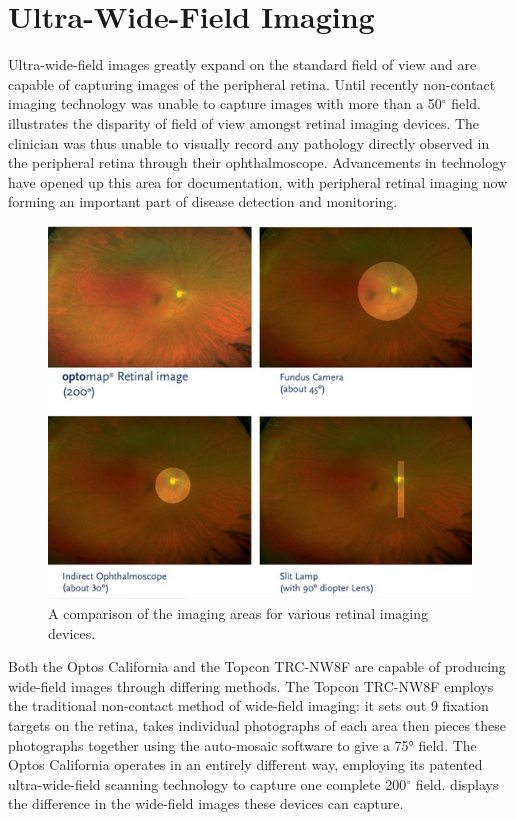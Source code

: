 \section{Ultra-Wide-Field Imaging}

Ultra-wide-field images greatly expand on the standard field of view and are capable of capturing images of the peripheral retina. Until recently non-contact imaging technology was unable to capture images with more than a 50$^\circ$ field.  illustrates the disparity of field of view amongst retinal imaging devices. The clinician was thus unable to visually record any pathology directly observed in the peripheral retina through their ophthalmoscope. Advancements in technology have opened up this area for documentation, with peripheral retinal imaging now forming an important part of disease detection and monitoring. 

\begin{figure}[htbp]
\centering
  \includegraphics{figures/uwfcomparison}
\caption{A comparison of the imaging areas for various retinal imaging devices.}
\label{fig:uwfc}
     \end{figure}

Both the Optos California and the Topcon TRC-NW8F are capable of producing wide-field images through differing methods. The Topcon TRC-NW8F employs the traditional non-contact method of wide-field imaging: it sets out 9 fixation targets on the retina, takes individual photographs of each area then pieces these photographs together using the auto-mosaic software to give a 75° field. The Optos California operates in an entirely different way, employing its patented ultra-wide-field scanning technology to capture one complete 200$^\circ$ field.  displays the difference in the wide-field images these devices can capture. 

